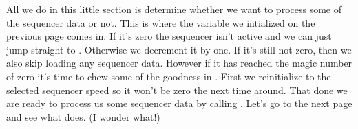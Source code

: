 All we do in this little section is determine whether we want to process some of the sequencer data or not. This is where the variable 
we intialized on the previous page comes in. If it's zero the sequencer isn't active and we can just jump straight to . Otherwise
we decrement it by one. If it's still not zero, then we also skip loading any sequencer data. However if it has reached the magic number of zero it's time to chew some of the 
goodness in . First we reinitialize  to the selected sequencer speed so it won't be zero the next time
around. That done we are ready to process us some sequencer data by calling . Let's go to the next page and see what does. (I wonder what!)

